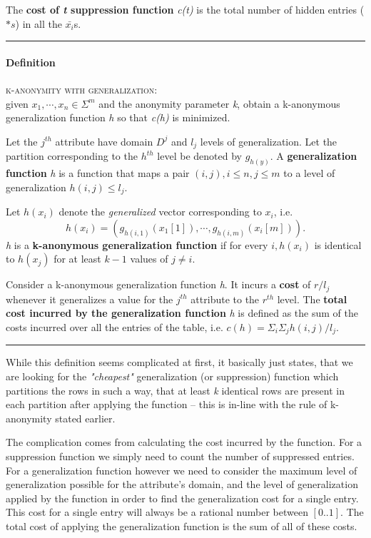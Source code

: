 The \textbf{cost of \textit{t} suppression function} \textit{c(t)} is the total number of hidden entries (\(*s\)) in all the \(\bar{x_i}\)s.

\begin{center}
	\rule{0.9\textwidth}{0.3pt}
\end{center}

\paragraph{Definition} \textsc{k-anonymity with generalization}: \\
given \(x_1,\cdots,x_n \in \Sigma^m\) and the anonymity parameter \textit{k}, obtain a k-anonymous generalization function \textit{h} so that \textit{c(h)} is minimized.

Let the \(j^{th}\) attribute have domain \(D^j\) and \(l_j\) levels of generalization. Let the partition corresponding to the \(h^{th}\) level be denoted by \(g_{h(y)}\). A \textbf{generalization function} \textit{h} is a function that maps a pair \((i,j), i \le n, j \le m\) to a level of generalization \(h(i,j) \le l_j\).

Let \(h(x_i)\) denote the \textit{generalized} vector corresponding to \(x_i\), i.e. \[h(x_i) = (g_{h(i,1)}(x_1[1]), \cdots, g_{h(i,m)}(x_i[m])).\] \textit{h} is a \textbf{k-anonymous generalization function} if for every \(i, h(x_i)\) is identical to \(h(x_j)\) for at least \(k-1\) values of \(j \neq i\).

Consider a k-anonymous generalization function \textit{h}. It incurs a \textbf{cost} of \(r/l_j\) whenever it generalizes a value for the \(j^{th}\) attribute to the \(r^{th}\) level. The \textbf{total cost incurred by the generalization function} \textit{h} is defined as the sum of the costs incurred over all the entries of the table, i.e. \(c(h) = \Sigma_i\Sigma_jh(i,j)/l_j\).

\begin{center}
	\rule{0.9\textwidth}{0.3pt}
\end{center}

While this definition seems complicated at first, it basically just states, that we are looking for the \textit{"cheapest"} generalization (or suppression) function which partitions the rows in such a way, that at least \textit{k} identical rows are present in each partition after applying the function -- this is in-line with the rule of k-anonymity stated earlier.

The complication comes from calculating the cost incurred by the function. For a suppression function we simply need to count the number of suppressed entries. For a generalization function however we need to consider the maximum level of generalization possible for the attribute's domain, and the level of generalization applied by the function in order to find the generalization cost for a single entry. This cost for a single entry will always be a rational  number between \([0..1]\). The total cost of applying the generalization function is the sum of all of these costs.

